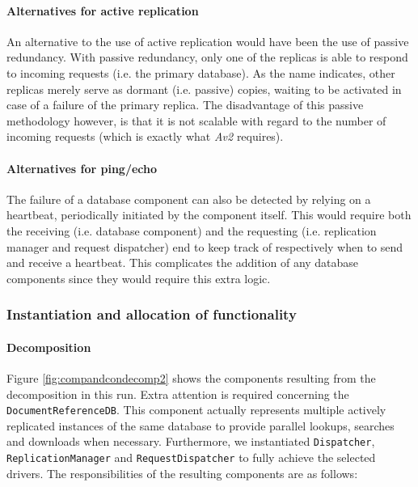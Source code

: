 \documentclass[a4paper,10pt]{article}
\begin{document}
\paragraph{Alternatives for active replication}
An alternative to the use of active replication would have been the use of passive redundancy. With passive redundancy, only one of the replicas is able to respond to incoming requests (i.e. the primary database). As the name indicates, other replicas merely serve as dormant (i.e. passive) copies, waiting to be activated in case of a failure of the primary replica. The disadvantage of this passive methodology however, is that it is not scalable with regard to the number of incoming requests (which is exactly what \emph{Av2} requires).

\paragraph{Alternatives for ping/echo}
The failure of a database component can also be detected by relying on a heartbeat, periodically initiated by the component itself. This would require both the receiving (i.e. database component) and the requesting (i.e. replication manager and request dispatcher) end to keep track of respectively when to send and receive a heartbeat. This complicates the addition of any database components since they would require this extra logic.

\subsubsection{Instantiation and allocation of functionality}
\paragraph{Decomposition}
Figure \ref{fig:compandcondecomp2} shows the components resulting from the decomposition in this run. Extra attention is required concerning the \texttt{DocumentReferenceDB}. This component actually represents multiple actively replicated instances of the same database to provide parallel lookups, searches and downloads when necessary. Furthermore, we instantiated \texttt{Dispatcher}, \texttt{ReplicationManager} and \texttt{RequestDispatcher} to fully achieve the selected drivers.
The responsibilities of the resulting components are as follows:
\end{document}
